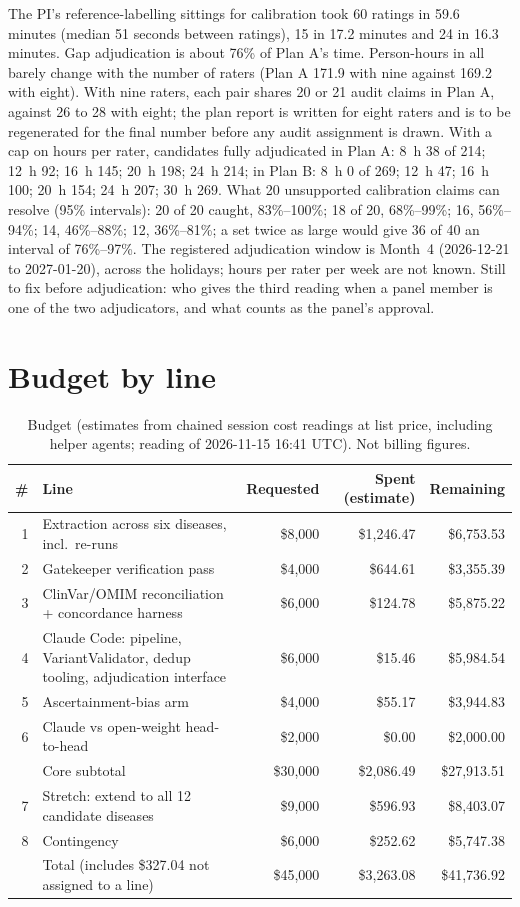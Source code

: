 \documentclass{article} %
\begin{document}
The PI's reference-labelling sittings for calibration took 60 ratings in 59.6 minutes (median 51 seconds between ratings), 15 in 17.2 minutes and 24 in 16.3 minutes. Gap adjudication is about 76\% of Plan A's time. Person-hours in all barely change with the number of raters (Plan A 171.9 with nine against 169.2 with eight). With nine raters, each pair shares 20 or 21 audit claims in Plan A, against 26 to 28 with eight; the plan report is written for eight raters and is to be regenerated for the final number before any audit assignment is drawn. With a cap on hours per rater, candidates fully adjudicated in Plan A: 8~h 38 of 214; 12~h 92; 16~h 145; 20~h 198; 24~h 214; in Plan B: 8~h 0 of 269; 12~h 47; 16~h 100; 20~h 154; 24~h 207; 30~h 269. What 20 unsupported calibration claims can resolve (95\% intervals): 20 of 20 caught, 83\%--100\%; 18 of 20, 68\%--99\%; 16, 56\%--94\%; 14, 46\%--88\%; 12, 36\%--81\%; a set twice as large would give 36 of 40 an interval of 76\%--97\%. The registered adjudication window is Month~4 (2026-12-21 to 2027-01-20), across the holidays; hours per rater per week are not known. Still to fix before adjudication: who gives the third reading when a panel member is one of the two adjudicators, and what counts as the panel's approval.

\section{Budget by line}
\label{app:budget}
\begin{table}[h]
\caption{Budget (estimates from chained session cost readings at list price, including helper agents; reading of 2026-11-15 16:41 UTC). Not billing figures.}
\begin{center}
\scriptsize
\begin{tabular}{rlrrr}
\toprule
\# & Line & Requested & Spent (estimate) & Remaining \\
\midrule
1 & Extraction across six diseases, incl.\ re-runs & \$8,000 & \$1,246.47 & \$6,753.53 \\
2 & Gatekeeper verification pass & \$4,000 & \$644.61 & \$3,355.39 \\
3 & ClinVar/OMIM reconciliation + concordance harness & \$6,000 & \$124.78 & \$5,875.22 \\
4 & Claude Code: pipeline, VariantValidator, dedup tooling, adjudication interface & \$6,000 & \$15.46 & \$5,984.54 \\
5 & Ascertainment-bias arm & \$4,000 & \$55.17 & \$3,944.83 \\
6 & Claude vs open-weight head-to-head & \$2,000 & \$0.00 & \$2,000.00 \\
 & Core subtotal & \$30,000 & \$2,086.49 & \$27,913.51 \\
7 & Stretch: extend to all 12 candidate diseases & \$9,000 & \$596.93 & \$8,403.07 \\
8 & Contingency & \$6,000 & \$252.62 & \$5,747.38 \\
 & Total (includes \$327.04 not assigned to a line) & \$45,000 & \$3,263.08 & \$41,736.92 \\
\bottomrule
\end{tabular}
\end{center}
\end{table}
\end{document}
